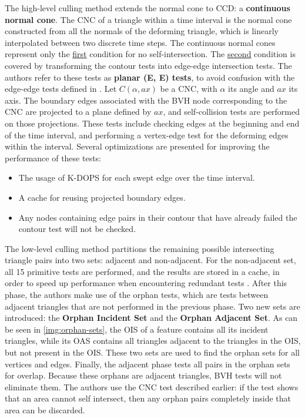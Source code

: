 The high-level culling method extends the normal cone to CCD: a \textbf{continuous normal cone}. The CNC of a triangle within a time interval is the normal cone constructed from all the normals of the deforming triangle, which is linearly interpolated between two discrete time steps. The continuous normal cones represent only the \hyperref[prop:sc1]{first} condition for no self-intersection. The \hyperref[prop:sc2]{second} condition is covered by transforming the contour tests into edge-edge intersection tests. The authors refer to these tests as \textbf{planar (E, E) tests}, to avoid confusion with the edge-edge tests defined in \citep{provot97}. Let $C(\alpha, ax)$ be a CNC, with $\alpha$ its angle and $ax$ its axis. The boundary edges associated with the BVH node corresponding to the CNC are projected to a plane defined by $ax$, and self-collision tests are performed on those projections. These tests include checking edges at the beginning and end of the time interval, and performing a vertex-edge test for the deforming edges within the interval. Several optimizations are presented for improving the performance of these tests:

\begin{itemize}
	\item The usage of K-DOPS for each swept edge over the time interval.
	\item A cache for reusing projected boundary edges.
	\item Any nodes containing edge pairs in their contour that have already failed the contour test will not be checked.
\end{itemize}

The low-level culling method partitions the remaining possible intersecting triangle pairs into two sets: adjacent and non-adjacent. For the non-adjacent set, all 15 primitive tests are performed, and the results are stored in a cache, in order to speed up performance when encountering redundant tests \citep{tang08}. After this phase, the authors make use of the orphan tests, which are tests between adjacent triangles that are not performed in the previous phase. Two new sets are introduced: the \textbf{Orphan Incident Set} and the \textbf{Orphan Adjacent Set}. As can be seen in \autoref{img:orphan-sets}, the OIS of a feature contains all its incident triangles, while its OAS contains all triangles adjacent to the triangles in the OIS, but not present in the OIS. These two sets are used to find the orphan sets for all vertices and edges. Finally, the adjacent phase tests all pairs in the orphan sets for overlap. Because these orphans are adjacent triangles, BVH tests will not eliminate them. The authors use the CNC test described earlier: if the test shows that an area cannot self intersect, then any orphan pairs completely inside that area can be discarded.

